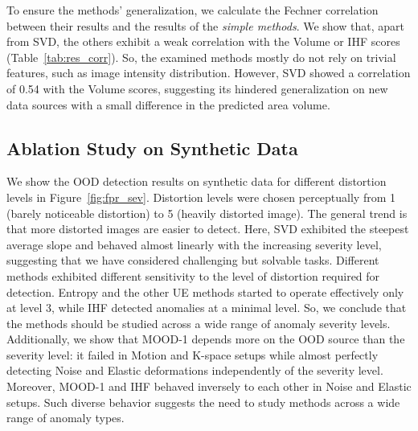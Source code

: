 To ensure the methods' generalization, we calculate the Fechner correlation between their results and the results of the \textit{simple methods}. We show that, apart from SVD, the others exhibit a weak correlation with the Volume or IHF scores (Table~\ref{tab:res_corr}). So, the examined methods mostly do not rely on trivial features, such as image intensity distribution. However, SVD showed a correlation of 0.54 with the Volume scores, suggesting its hindered generalization on new data sources with a small difference in the predicted area volume.




\subsection{Ablation Study on Synthetic Data}

We show the OOD detection results on synthetic data for different distortion levels in Figure~\ref{fig:fpr_sev}. Distortion levels were chosen perceptually from 1 (barely noticeable distortion) to 5 (heavily distorted image). The general trend is that more distorted images are easier to detect. Here, SVD exhibited the steepest average slope and behaved almost linearly with the increasing severity level, suggesting that we have considered challenging but solvable tasks. Different methods exhibited different sensitivity to the level of distortion required for detection. Entropy and the other UE methods started to operate effectively only at level 3, while IHF detected anomalies at a minimal level. So, we conclude that the methods should be studied across a wide range of anomaly severity levels. Additionally, we show that MOOD-1 depends more on the OOD source than the severity level: it failed in Motion and K-space setups while almost perfectly detecting Noise and Elastic deformations independently of the severity level. Moreover, MOOD-1 and IHF behaved inversely to each other in Noise and Elastic setups. Such diverse behavior suggests the need to study methods across a wide range of anomaly types.


